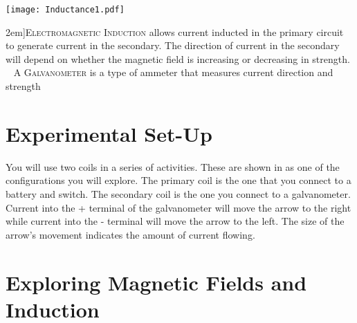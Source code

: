 \begin{figure*}
	\vspace{2em}
	\centering	\label{f:induction-galvanometer}
	\texttt{[image: Inductance1.pdf]}
	\caption[Electromagnetic Induction][2em]{\textsc{Electromagnetic Induction} allows current inducted in the primary circuit to generate current in the secondary.  The direction of current in the secondary will depend on whether the magnetic field is increasing or decreasing in strength. \newline~ \newline A \textsc{Galvanometer} is a type of ammeter that measures current direction and strength}
\end{figure*}

\section{Experimental Set-Up}
You will use two coils in a series of activities.  These are shown in  as one of the configurations you will explore.  The primary coil is the one that you connect to a battery and switch.  The secondary coil is the one you connect to a galvanometer.  Current into the + terminal of the galvanometer will move the arrow to the right while current into the - terminal will move the arrow to the left.  The size of the arrow's movement indicates the amount of current flowing.



\section{Exploring Magnetic Fields and Induction}

